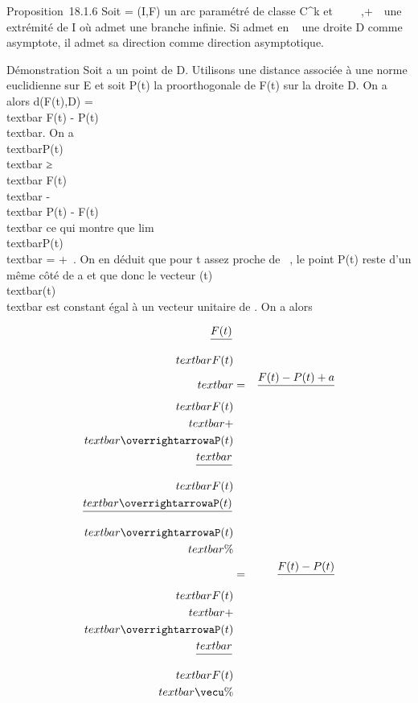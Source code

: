 \documentclass[]{article}
\begin{document}
Proposition~18.1.6 Soit \Gamma = (I,F) un arc paramétré de classe
C^k et \alpha~ \in {}~ \cup\-\infty~,+\infty~\ une
extrémité de I où \Gamma admet une branche infinie. Si \Gamma admet en \alpha~ une
droite D comme asymptote, il admet sa direction \vecD
comme direction asymptotique.

Démonstration Soit a un point de D. Utilisons une distance associée à
une norme euclidienne sur E et soit P(t) la pro\jmathection orthogonale de
F(t) sur la droite D. On a alors d(F(t),D) =\\textbar{}
F(t) - P(t)\\textbar{}. On a
\\textbar{}P(t)\\textbar{}
≥\\textbar{} F(t)\\textbar{}
-\\textbar{} P(t) - F(t)\\textbar{} ce qui
montre que
lim~\\textbar{}P(t)\\textbar{}
= +\infty~. On en déduit que pour t assez proche de \alpha~, le point P(t) reste
d'un même côté de a et que donc le vecteur 
\overrightarrowaP(t) \over
\\textbar{}\overrightarrowaP(t)\\textbar{}
est constant égal à un vecteur unitaire \vecu de
\vecD. On a alors

\begin{align*} F(t) \over
\\textbar{}F(t)\\textbar{} & =& F(t)
- P(t) + a \over
\\textbar{}F(t)\\textbar{} +
\\textbar{}\overrightarrowaP(t)\\textbar{}
\over
\\textbar{}F(t)\\textbar{} 
\overrightarrowaP(t) \over
\\textbar{}\overrightarrowaP(t)\\textbar{}
\%& \\ & =& F(t) - P(t)
\over
\\textbar{}F(t)\\textbar{} +
\\textbar{}\overrightarrowaP(t)\\textbar{}
\over
\\textbar{}F(t)\\textbar{}
\vecu \%& \\
\end{align*}
\end{document}
